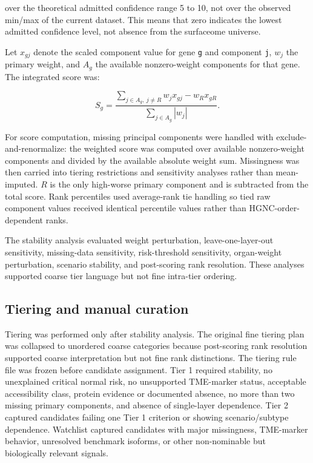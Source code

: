 \documentclass[preprint,12pt,authoryear]{elsarticle}
\begin{document}
over the theoretical admitted confidence range 5 to 10, not over the observed min/\allowbreak{}max of the current dataset. This means that zero indicates the lowest admitted confidence level, not absence from the surfaceome universe.

Let $x_{gj}$ denote the scaled component value for gene \texttt{g} and component \texttt{j}, $w_j$ the primary weight, and $A_g$ the available nonzero-weight components for that gene. The integrated score was:

\begin{equation}
S_g =
\frac{
\sum_{j\in A_g,\ j\neq R} w_j x_{gj}
- w_R x_{gR}
}{
\sum_{j\in A_g} |w_j|
}.
\end{equation}

For score computation, missing principal components were handled with exclude-and-renormalize: the weighted score was computed over available nonzero-weight components and divided by the available absolute weight sum. Missingness was then carried into tiering restrictions and sensitivity analyses rather than mean-imputed. $R$ is the only high-worse primary component and is subtracted from the total score. Rank percentiles used average-rank tie handling so tied raw component values received identical percentile values rather than HGNC-order-dependent ranks.

The stability analysis evaluated weight perturbation, leave-one-layer-out sensitivity, missing-data sensitivity, risk-threshold sensitivity, organ-weight perturbation, scenario stability, and post-scoring rank resolution. These analyses supported coarse tier language but not fine intra-tier ordering.

\subsection{Tiering and manual curation}

Tiering was performed only after stability analysis. The original fine tiering plan was collapsed to unordered coarse categories because post-scoring rank resolution supported coarse interpretation but not fine rank distinctions. The tiering rule file was frozen before candidate assignment. Tier 1 required stability, no unexplained critical normal risk, no unsupported TME-marker status, acceptable accessibility class, protein evidence or documented absence, no more than two missing primary components, and absence of single-layer dependence. Tier 2 captured candidates failing one Tier 1 criterion or showing scenario/\allowbreak{}subtype dependence. Watchlist captured candidates with major missingness, TME-marker behavior, unresolved benchmark isoforms, or other non-nominable but biologically relevant signals.
\end{document}
